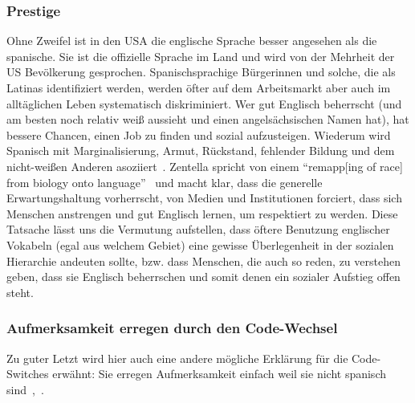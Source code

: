 \subsubsection{Prestige}
Ohne Zweifel ist in den USA die englische Sprache besser angesehen als die spanische.
Sie ist die offizielle Sprache im Land und wird von der Mehrheit der US Bevölkerung gesprochen.
Spanischsprachige Bürgerinnen und solche, die als Latinas identifiziert werden, werden öfter auf dem Arbeitsmarkt aber auch im alltäglichen Leben systematisch diskriminiert.
Wer gut Englisch beherrscht (und am besten noch relativ weiß aussieht und einen angelsächsischen Namen hat), hat bessere Chancen, einen Job zu finden und sozial aufzusteigen.
Wiederum wird Spanisch mit Marginalisierung, Armut, Rückstand, fehlender Bildung und dem nicht-weißen Anderen asoziiert~\cite{Zentella07}.
Zentella spricht von einem ``remapp[ing of race] from biology onto language''~\cite{Zentella07}
und macht klar, dass die generelle Erwartungshaltung vorherrscht, von Medien und Institutionen forciert, dass sich Menschen anstrengen und gut Englisch lernen, um respektiert zu werden.
Diese Tatsache lässt uns die Vermutung aufstellen, dass öftere Benutzung englischer Vokabeln (egal aus welchem Gebiet) eine gewisse Überlegenheit in der sozialen Hierarchie andeuten sollte, bzw. dass Menschen, die auch so reden, zu verstehen geben, dass sie Englisch beherrschen und somit denen ein sozialer Aufstieg offen steht.

\begin{comment}
Genau damit würde ich die Kategorie der englischen Discourse Markers (DE?) erklären.
Sonst ist es kaum nachvollziehbar, warum im Text ``anyway'', ``must'' oder ``pros and contras'' erscheinen sollten, anstatt auf diese komplett zu verzichten, bzw. die spanischen Übersetzungen zu benutzen. %
Bei gesprochener Sprache kann man sich diese Gebrauche noch mit spontanem Ausdruck erklären, bei dem Medium Zeitschrift jedoch, wo die Autorinnen der Artikel Zeit zum Nachdenken hatten und der Text vermutlich einen (mehrstuffigen) Redigierprozess durchlaufen hat, kann von Spontanietät kaum die Rede sein.
\end{comment}

\subsubsection{Aufmerksamkeit erregen durch den Code-Wechsel}
Zu guter Letzt wird hier auch eine andere mögliche Erklärung für die Code-Switches erwähnt:
Sie erregen Aufmerksamkeit einfach weil sie nicht spanisch sind~\cite[]{Mahootian05},~\cite{Lee99}.

